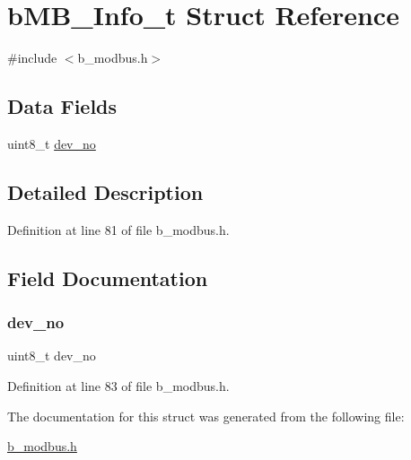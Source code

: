 \hypertarget{structb_m_b___info__t}{}\section{b\+M\+B\+\_\+\+Info\+\_\+t Struct Reference}
\label{structb_m_b___info__t}


{\ttfamily \#include $<$b\+\_\+modbus.\+h$>$}

\subsection*{Data Fields}
\begin{DoxyCompactItemize}
\item 
uint8\+\_\+t \mbox{\hyperlink{structb_m_b___info__t_a858e2685fb0034acadcd8d48cf6f02b2}{dev\+\_\+no}}
\end{DoxyCompactItemize}


\subsection{Detailed Description}


Definition at line 81 of file b\+\_\+modbus.\+h.



\subsection{Field Documentation}
\mbox{\label{structb_m_b___info__t_a858e2685fb0034acadcd8d48cf6f02b2}} 
\subsubsection{\texorpdfstring{dev\+\_\+no}{dev\_no}}
{\footnotesize\ttfamily uint8\+\_\+t dev\+\_\+no}



Definition at line 83 of file b\+\_\+modbus.\+h.



The documentation for this struct was generated from the following file\+:\begin{DoxyCompactItemize}
\item 
\mbox{\hyperlink{b__modbus_8h}{b\+\_\+modbus.\+h}}\end{DoxyCompactItemize}
